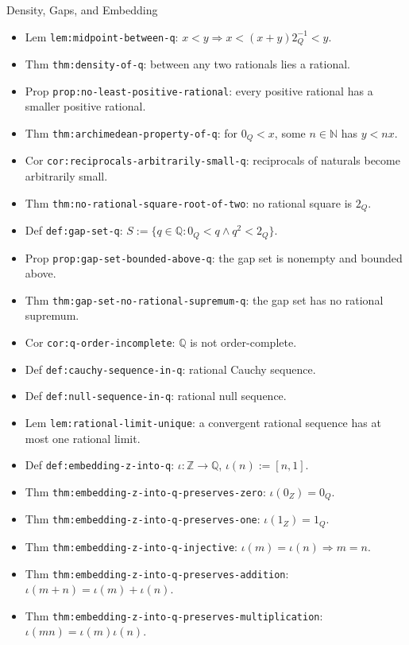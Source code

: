 \begin{topicbox}{Density, Gaps, and Embedding}
\begin{itemize}
  \item Lem \texttt{lem:midpoint-between-q}: $x<y\Rightarrow x<(x+y)2_Q^{-1}<y$.
  \item Thm \texttt{thm:density-of-q}: between any two rationals lies a rational.
  \item Prop \texttt{prop:no-least-positive-rational}: every positive rational has a smaller positive rational.
  \item Thm \texttt{thm:archimedean-property-of-q}: for $0_Q<x$, some $n\in\mathbb{N}$ has $y<nx$.
  \item Cor \texttt{cor:reciprocals-arbitrarily-small-q}: reciprocals of naturals become arbitrarily small.
  \item Thm \texttt{thm:no-rational-square-root-of-two}: no rational square is $2_Q$.
  \item Def \texttt{def:gap-set-q}: $S:=\{q\in\mathbb{Q}:0_Q<q\land q^2<2_Q\}$.
  \item Prop \texttt{prop:gap-set-bounded-above-q}: the gap set is nonempty and bounded above.
  \item Thm \texttt{thm:gap-set-no-rational-supremum-q}: the gap set has no rational supremum.
  \item Cor \texttt{cor:q-order-incomplete}: $\mathbb{Q}$ is not order-complete.
  \item Def \texttt{def:cauchy-sequence-in-q}: rational Cauchy sequence.
  \item Def \texttt{def:null-sequence-in-q}: rational null sequence.
  \item Lem \texttt{lem:rational-limit-unique}: a convergent rational sequence has at most one rational limit.
  \item Def \texttt{def:embedding-z-into-q}: $\iota:\mathbb{Z}\to\mathbb{Q}$, $\iota(n):=[n,1]$.
  \item Thm \texttt{thm:embedding-z-into-q-preserves-zero}: $\iota(0_Z)=0_Q$.
  \item Thm \texttt{thm:embedding-z-into-q-preserves-one}: $\iota(1_Z)=1_Q$.
  \item Thm \texttt{thm:embedding-z-into-q-injective}: $\iota(m)=\iota(n)\Rightarrow m=n$.
  \item Thm \texttt{thm:embedding-z-into-q-preserves-addition}: $\iota(m+n)=\iota(m)+\iota(n)$.
  \item Thm \texttt{thm:embedding-z-into-q-preserves-multiplication}: $\iota(mn)=\iota(m)\iota(n)$.

\end{itemize}
\end{topicbox}
